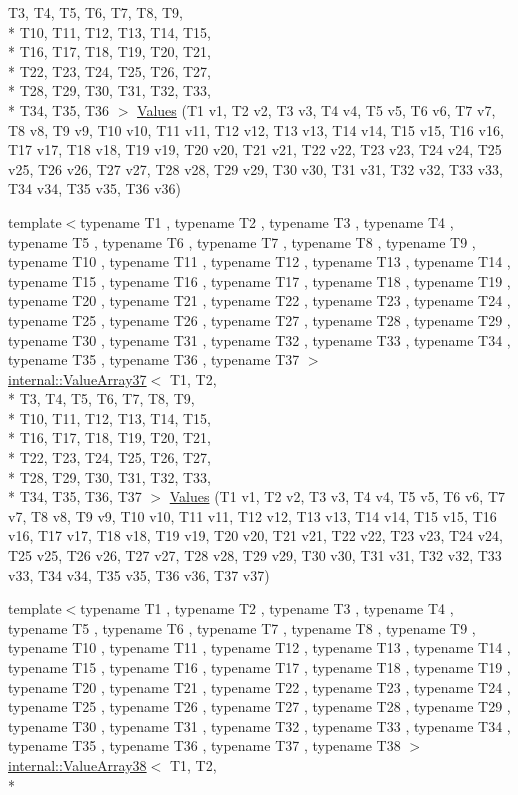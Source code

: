 \begin{DoxyCompactItemize}
T3, T4, T5, T6, T7, T8, T9, \\*
T10, T11, T12, T13, T14, T15, \\*
T16, T17, T18, T19, T20, T21, \\*
T22, T23, T24, T25, T26, T27, \\*
T28, T29, T30, T31, T32, T33, \\*
T34, T35, T36 $>$ \hyperlink{namespacetesting_ae5d25537f4919c9e82d02c45af4c7c5f}{Values} (T1 v1, T2 v2, T3 v3, T4 v4, T5 v5, T6 v6, T7 v7, T8 v8, T9 v9, T10 v10, T11 v11, T12 v12, T13 v13, T14 v14, T15 v15, T16 v16, T17 v17, T18 v18, T19 v19, T20 v20, T21 v21, T22 v22, T23 v23, T24 v24, T25 v25, T26 v26, T27 v27, T28 v28, T29 v29, T30 v30, T31 v31, T32 v32, T33 v33, T34 v34, T35 v35, T36 v36)
\item 
{\footnotesize template$<$typename T1 , typename T2 , typename T3 , typename T4 , typename T5 , typename T6 , typename T7 , typename T8 , typename T9 , typename T10 , typename T11 , typename T12 , typename T13 , typename T14 , typename T15 , typename T16 , typename T17 , typename T18 , typename T19 , typename T20 , typename T21 , typename T22 , typename T23 , typename T24 , typename T25 , typename T26 , typename T27 , typename T28 , typename T29 , typename T30 , typename T31 , typename T32 , typename T33 , typename T34 , typename T35 , typename T36 , typename T37 $>$ }\\\hyperlink{classtesting_1_1internal_1_1_value_array37}{internal\-::\-Value\-Array37}$<$ T1, T2, \\*
T3, T4, T5, T6, T7, T8, T9, \\*
T10, T11, T12, T13, T14, T15, \\*
T16, T17, T18, T19, T20, T21, \\*
T22, T23, T24, T25, T26, T27, \\*
T28, T29, T30, T31, T32, T33, \\*
T34, T35, T36, T37 $>$ \hyperlink{namespacetesting_aa800bbbe42a44b1776cfd61c9e337ab6}{Values} (T1 v1, T2 v2, T3 v3, T4 v4, T5 v5, T6 v6, T7 v7, T8 v8, T9 v9, T10 v10, T11 v11, T12 v12, T13 v13, T14 v14, T15 v15, T16 v16, T17 v17, T18 v18, T19 v19, T20 v20, T21 v21, T22 v22, T23 v23, T24 v24, T25 v25, T26 v26, T27 v27, T28 v28, T29 v29, T30 v30, T31 v31, T32 v32, T33 v33, T34 v34, T35 v35, T36 v36, T37 v37)
\item 
{\footnotesize template$<$typename T1 , typename T2 , typename T3 , typename T4 , typename T5 , typename T6 , typename T7 , typename T8 , typename T9 , typename T10 , typename T11 , typename T12 , typename T13 , typename T14 , typename T15 , typename T16 , typename T17 , typename T18 , typename T19 , typename T20 , typename T21 , typename T22 , typename T23 , typename T24 , typename T25 , typename T26 , typename T27 , typename T28 , typename T29 , typename T30 , typename T31 , typename T32 , typename T33 , typename T34 , typename T35 , typename T36 , typename T37 , typename T38 $>$ }\\\hyperlink{classtesting_1_1internal_1_1_value_array38}{internal\-::\-Value\-Array38}$<$ T1, T2, \\*

\end{DoxyCompactItemize}
